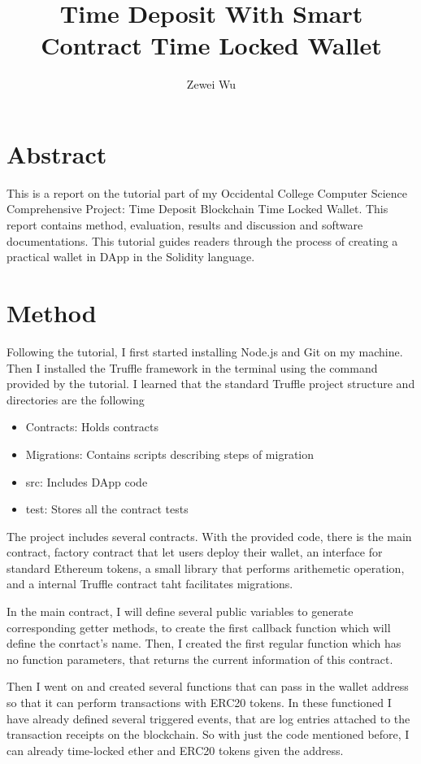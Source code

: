 \documentclass[10pt,twocolumn]{article}
\title{Time Deposit With Smart Contract Time Locked Wallet}
\author{Zewei Wu}
\affiliation{Occidental College}
\begin{document}
\maketitle

\section{Abstract}
This is a report on the tutorial part of my Occidental College Computer Science Comprehensive Project: Time Deposit Blockchain Time Locked Wallet. This report contains method, evaluation, results and discussion and software documentations. This tutorial guides readers through the process of creating a practical wallet in DApp in the Solidity language.\cite{Radek}

\section{Method}
Following the tutorial, I first started installing Node.js and Git on my machine. Then I installed the Truffle framework in the terminal using the command provided by the tutorial. I learned that the standard Truffle project structure and directories are the following

\begin{itemize}
    \item Contracts: Holds contracts
    \item Migrations: Contains scripts describing steps of migration
    \item src: Includes DApp code
    \item test: Stores all the contract tests
\end{itemize}

The project includes several contracts. With the provided code, there is the main contract, factory contract that let users deploy their wallet, an interface for standard Ethereum tokens, a small library that performs arithemetic operation, and a internal Truffle contract taht facilitates migrations.

In the main contract, I will define several public variables to generate corresponding getter methods, to create the first callback function which will define the conrtact's name. Then, I created the first regular function which has no function parameters, that returns the current information of this contract.

Then I went on and created several functions that can pass in the wallet address so that it can perform transactions with ERC20 tokens. In these functioned I have already defined several triggered events, that are log entries attached to the transaction receipts on the blockchain. So with just the code mentioned before, I can already time-locked ether and ERC20 tokens given the address.
\end{document}
